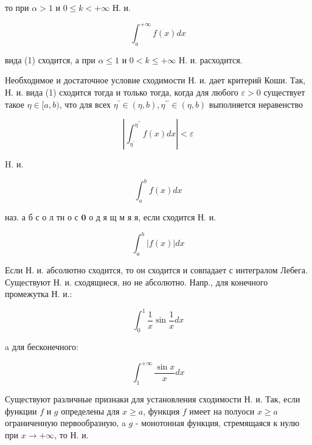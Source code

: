 \documentclass[10pt]{article}
\begin{document}
то при $\alpha>1$ и $0 \leqslant k<+\infty$ Н. и.



\[

\int_{a}^{+\infty} f(x) d x

\]



вида (1) сходится, а при $\alpha \leqslant 1$ и $0<k \leqslant+\infty$ Н. и. расходится.



Необходимое и достаточное условие сходимости Н. и. дает критерий Коши. Так, Н. и. вида (1) сходится тогда и только тогда, когда для любого $\varepsilon>0$ существует такое $\eta \in[a, b)$, что для всех $\eta^{\prime} \in(\eta, b), \eta^{\prime \prime} \in(\eta, b)$ выполняется неравенство



\[

\left|\int_{\eta^{\prime}}^{\eta^{\prime \prime}} f(x) d x\right|<\varepsilon

\]



H. и.



\[

\int_{a}^{b} f(x) d x

\]



наз. а б с о л тн о с $\mathbf{0}$ о д я щ м я я, если сходится Н. и.



\[

\int_{a}^{b}|f(x)| d x

\]



Если Н. и. абсолютно сходится, то он сходится и совпадает с интегралом Лебега. Существуют Н. и. сходящиеся, но не абсолютно. Напр., для конечного промежутка Н. и.:



\[

\int_{0}^{1} \frac{1}{x} \sin \frac{1}{x} d x

\]



a для бесконечного:



\[

\int_{1}^{+\infty} \frac{\sin x}{x} d x

\]



Существуют различные признаки для установления сходимости Н. и. Так, если функции $f$ и $g$ определены для $x \geqslant a$, функция $f$ имеет на полуоси $x \geqslant a$ ограниченную первообразную, a $g$ - монотонная функция, стремящаяся к нулю при $x \rightarrow+\infty$, то Н. и.
\end{document}
